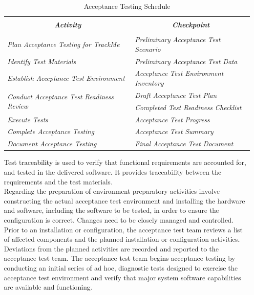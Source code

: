 \documentclass[a4paper, hidelinks, 12pt]{report}
\begin{document}
\begin{table}[H]
  \centering
  \caption{Acceptance Testing Schedule}
    \begin{tabular}{|l|l|}
    \toprule
   \multicolumn{1}{|c|}{\multirow{3}[2]{*}{\textit{\textbf{Activity}}}} &  \\
& \multicolumn{1}{c|}{\textit{\textbf{Checkpoint}}} \\
 &  \\
    \midrule
    \textit{Plan Acceptance Testing for  TrackMe} & \textit{Preliminary Acceptance Test Scenario} \\
    \midrule
    \textit{Identify Test Materials} & \textit{Preliminary Acceptance Test Data} \\
    \midrule
    \textit{Establish Acceptance Test Environment} & \textit{Acceptance Test Environment Inventory} \\
    \midrule
    \multirow{2}[2]{*}{\textit{Conduct Acceptance Test Readiness Review}} & \textit{Draft Acceptance Test Plan} \\
          & \textit{Completed Test Readiness Checklist} \\
    \midrule
    \textit{Execute Tests} & \textit{Acceptance Test Progress} \\
    \midrule
    \textit{Complete Acceptance Testing} & \textit{Acceptance Test Summary } \\
    \midrule
    \textit{Document Acceptance Testing} & \textit{Final Acceptance Test Document} \\
    \bottomrule
    \end{tabular}%
  \label{tab:addlabel}%
\end{table}%
Test traceability is used to verify that functional requirements are accounted for, and tested in the delivered software.  It provides traceability between the requirements and the test materials.\\
Regarding the preparation of environment preparatory activities involve constructing the actual acceptance test environment and installing the hardware and software, including the software to be tested, in order to ensure the configuration is correct.  Changes need to be closely managed and controlled.  Prior to an installation or configuration, the acceptance test team reviews a list of affected components and the planned installation or configuration activities.  Deviations from the planned activities are recorded and reported to the acceptance test team.  The acceptance test team begins acceptance testing by conducting an initial series of ad hoc, diagnostic tests designed to exercise the acceptance test environment and verify that major system software capabilities are available and functioning.\\\\
\end{document}
